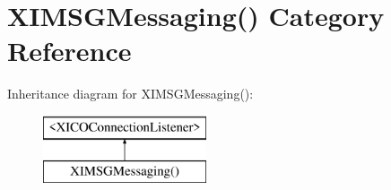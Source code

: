 \hypertarget{category_x_i_m_s_g_messaging_07_08}{}\section{X\+I\+M\+S\+G\+Messaging() Category Reference}
\label{category_x_i_m_s_g_messaging_07_08}
Inheritance diagram for X\+I\+M\+S\+G\+Messaging()\+:\begin{figure}[H]
\begin{center}
\leavevmode
\includegraphics[height=2.000000cm]{category_x_i_m_s_g_messaging_07_08}
\end{center}
\end{figure}
